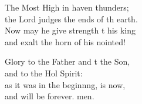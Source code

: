 \begin{psalmverse}
\begin{patverse}
The Most High in haven thunders;\Med\\
the Lord judges the ends of th earth.\\
Now may he give strength t his king\Med\\
and exalt the horn of his nointed!

Glory to the Father and t the Son,\Med\\
and to the Hol Spirit:\\
as it was in the beginn\pointup{\i}ng, is now,\Med\\
and will be forever. men.
  \end{patverse}
\end{psalmverse}
